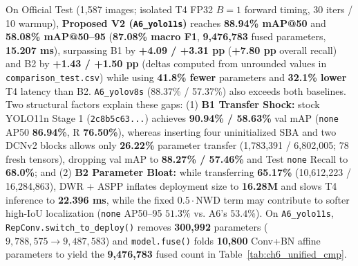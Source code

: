 On Official Test (1,587 images; isolated T4 FP32 $B=1$ forward timing, 30 iters / 10 warmup), \textbf{Proposed V2 (\texttt{A6\_yolo11s})} reaches \textbf{88.94\% mAP@50} and \textbf{58.08\% mAP@50--95} (\textbf{87.08\% macro F1}, \textbf{9,476,783} fused parameters, \textbf{15.207 ms}), surpassing B1 by \textbf{+4.09 / +3.31 pp} (\textbf{+7.80 pp} overall recall) and B2 by \textbf{+1.43 / +1.50 pp} (deltas computed from unrounded values in \nolinkurl{comparison_test.csv}) while using \textbf{41.8\% fewer} parameters and \textbf{32.1\% lower} T4 latency than B2. \texttt{A6\_yolov8s} (88.37\% / 57.37\%) also exceeds both baselines. Two structural factors explain these gaps: (1) \textbf{B1 Transfer Shock:} stock YOLO11n Stage 1 (\texttt{2c8b5c63...}) achieves \textbf{90.94\% / 58.63\%} val mAP (\texttt{none} AP50 \textbf{86.94\%}, R \textbf{76.50\%}), whereas inserting four uninitialized SBA and two DCNv2 blocks allows only \textbf{26.22\%} parameter transfer (1,783,391 / 6,802,005; 78 fresh tensors), dropping val mAP to \textbf{88.27\% / 57.46\%} and Test \texttt{none} Recall to \textbf{68.0\%}; and (2) \textbf{B2 Parameter Bloat:} while transferring \textbf{65.17\%} (10,612,223 / 16,284,863), DWR + ASPP inflates deployment size to \textbf{16.28M} and slows T4 inference to \textbf{22.396 ms}, while the fixed $0.5 \cdot \mathrm{NWD}$ term may contribute to softer high-IoU localization (\texttt{none} AP50--95 $51.3\%$ vs. A6's $53.4\%$). On \texttt{A6\_yolo11s}, \nolinkurl{RepConv.switch_to_deploy()} removes \textbf{300,992} parameters ($9,788,575 \to 9,487,583$) and \nolinkurl{model.fuse()} folds \textbf{10,800} Conv+BN affine parameters to yield the \textbf{9,476,783} fused count in Table~\ref{tab:ch6_unified_cmp}.

